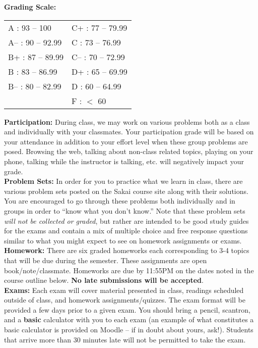 \documentclass[11pt]{article}
\begin{document}
\textbf{Grading Scale:}

\begin{center}
	\begin{tabular}{ p{3.5cm} p{3.5cm} }
		A : 93 -- 100 &  C+ : 77 -- 79.99\\
		A-- : 90 -- 92.99 & C : 73 -- 76.99\\
		B+ : 87 -- 89.99 & C-- : 70 -- 72.99\\
		B : 83 -- 86.99 & D+ : 65 -- 69.99\\
		B-- : 80 -- 82.99 & D : 60 -- 64.99\\
		& F : $<$ 60
		
		
	\end{tabular}
\end{center}


\newpage

\textbf{Participation:} During class, we may work on various problems both as a class and individually with your classmates. Your participation grade will be based on your attendance in addition to your effort level when these group problems are posed. Browsing the web, talking about non-class related topics, playing on your phone, talking while the instructor is talking, etc. will negatively impact your grade.
\\

\textbf{Problem Sets:} In order for you to practice what we learn in class, there are various problem sets posted on the Sakai course site along with their solutions. You are encouraged to go through these problems both individually and in groups in order to ``know what you don't know.'' Note that these problem sets \textit{will not be collected or graded}, but rather are intended to be good study guides for the exams and contain a mix of multiple choice and free response questions similar to what you might expect to see on homework assignments or exams. \\

\textbf{Homework:} There are six graded homeworks each corresponding to 3-4 topics that will be due during the semester. These assignments are open book/note/classmate. Homeworks are due by 11:55PM on the dates noted in the course outline below. \textbf{No late submissions will be accepted}.  \\

\textbf{Exams:} Each exam will cover material presented in class, readings scheduled outside of class, and homework assignments/quizzes. The exam format will be provided a few days prior to a given exam. You should bring a pencil, scantron, and a \textbf{basic} calculator with you to each exam (an example of what constitutes a basic calculator is provided on Moodle -- if in doubt about yours, ask!). Students that arrive more than 30 minutes late will not be permitted to take the exam. 
\\
\end{document}
